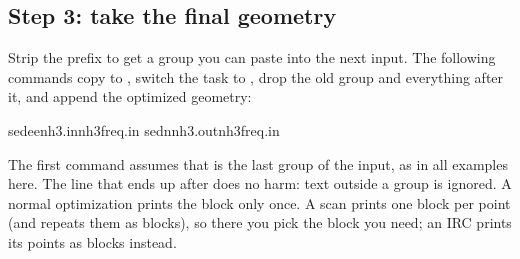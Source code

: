 \documentclass[letterpaper,10pt,english,openany,oneside]{sphinxmanual}
\begin{document}
\subsection{Step 3: take the final geometry}
\label{\detokenize{start/getting-started:step-3-take-the-final-geometry}}
\sphinxAtStartPar
Strip the  prefix to get a group you can paste into the next input. The following commands copy  to
, switch the task to , drop the old  group and everything after it, and append the
optimized geometry:

\begin{sphinxVerbatim}[commandchars=\\\{\}]
sed\PYGZhy{}e\PYGZhy{}enh3.in\PYGZgt{}nh3\PYGZus{}freq.in
sed\PYGZhy{}nnh3.out\PYGZgt{}\PYGZgt{}nh3\PYGZus{}freq.in
\end{sphinxVerbatim}



\sphinxAtStartPar
The first command assumes that  is the last group of the input, as in all examples here. The 
line that ends up after  does no harm: text outside a group is ignored. A normal optimization prints the 
block only once. A scan prints one  block per point (and repeats them as  blocks), so there you pick
the block you need; an IRC prints its points as  blocks instead.
\end{document}
